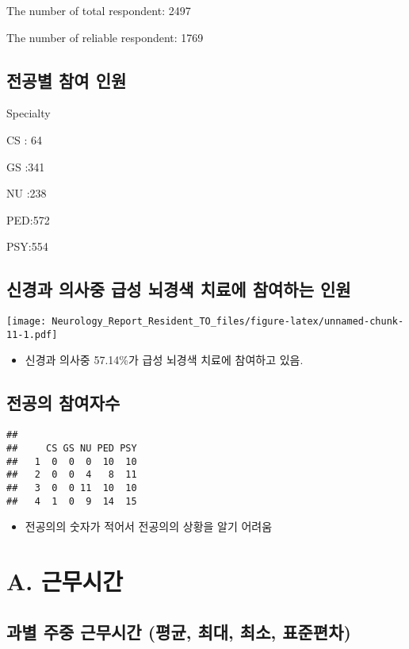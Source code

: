 \documentclass[]{book}
\providecommand{\tightlist}{%
  \setlength{\itemsep}{0pt}\setlength{\parskip}{0pt}}
\begin{document}
The number of total respondent: 2497

The number of reliable respondent: 1769

\hypertarget{section-13}{%
\subsection{전공별 참여 인원}\label{section-13}}

Specialty

CS : 64

GS :341

NU :238

PED:572

PSY:554

\hypertarget{section-14}{%
\subsection{신경과 의사중 급성 뇌경색 치료에 참여하는 인원}\label{section-14}}

\texttt{[image: Neurology\_Report\_Resident\_TO\_files/figure-latex/unnamed-chunk-11-1.pdf]}

\begin{itemize}
\tightlist
\item
  신경과 의사중 57.14\%가 급성 뇌경색 치료에 참여하고 있음.
\end{itemize}

\hypertarget{section-15}{%
\subsection{전공의 참여자수}\label{section-15}}

\begin{verbatim}
##    
##     CS GS NU PED PSY
##   1  0  0  0  10  10
##   2  0  0  4   8  11
##   3  0  0 11  10  10
##   4  1  0  9  14  15
\end{verbatim}

\begin{itemize}
\tightlist
\item
  전공의의 숫자가 적어서 전공의의 상황을 알기 어려움
\end{itemize}

\hypertarget{a.-}{%
\section{A. 근무시간}\label{a.-}}

\hypertarget{section-16}{%
\subsection{과별 주중 근무시간 (평균, 최대, 최소, 표준편차)}\label{section-16}}
\end{document}
